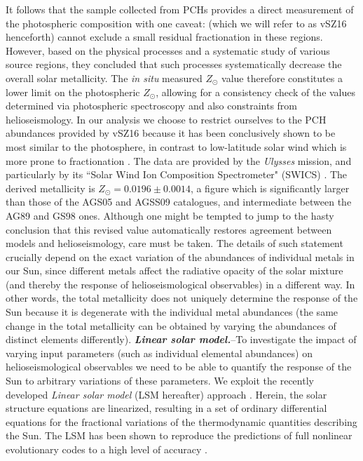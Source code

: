 \documentclass[aps,prl,twocolumn,showpacs]{revtex4}
\begin{document}
%
It follows that the sample collected from PCHs provides a direct measurement of the photospheric composition with one caveat:  \cite{z16} (which we will refer to as vSZ16 henceforth) cannot exclude a small residual fractionation in these regions. However, based on the physical processes and a systematic study of various source regions, they concluded that such processes systematically decrease the overall solar metallicity. The \textit{in situ} measured $Z_{\odot}$ value therefore constitutes a lower limit on the photospheric $Z_{\odot}$, allowing for a consistency check of the values determined via photospheric spectroscopy and also constraints from helioseismology. In our analysis we choose to restrict ourselves to the PCH abundances provided by vSZ16 because it has been conclusively shown to be most similar to the photosphere, in contrast to low-latitude solar wind which is more prone to fractionation \cite{feldman,reisenfeld,z16}. The data are provided by the \textit{Ulysses} mission, and particularly by its ``Solar Wind Ion Composition Spectrometer" (SWICS) \cite{swics}. \newline \indent
%
The derived metallicity is $Z_{\odot} = 0.0196 \pm 0.0014$, a figure which is significantly larger than those of the AGS05 \cite{ags05} and AGSS09 \cite{agss09} catalogues, and intermediate between the AG89 \cite{ag89} and GS98 \cite{gs98} ones. Although one might be tempted to jump to the hasty conclusion that this revised value automatically restores agreement between models and helioseismology, care must be taken. The details of such statement crucially depend on the exact variation of the abundances of individual metals in our Sun, since different metals affect the radiative opacity of the solar mixture (and thereby the response of helioseismological observables) in a different way. In other words, the total metallicity does not uniquely determine the response of the Sun because it is degenerate with the individual metal abundances (the same change in the total metallicity can be obtained by varying the abundances of distinct elements differently). \newline \indent
%
\textbf{\textit{Linear solar model.\/}}\---To investigate the impact of varying input parameters (such as individual elemental abundances) on helioseismological observables we need to be able to quantify the response of the Sun to arbitrary variations of these parameters. We exploit the recently developed \textit{Linear solar model} (LSM hereafter) approach \cite{villante5,villante4}. Herein, the solar structure equations are linearized, resulting in a set of ordinary differential equations for the fractional variations of the thermodynamic quantities describing the Sun. The LSM has been shown to reproduce the predictions of full nonlinear evolutionary codes to a high level of accuracy \cite{villante5}. \newline \indent
\end{document}
